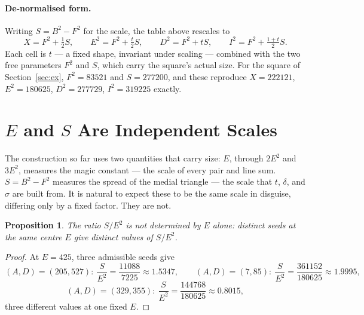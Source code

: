 \documentclass[12pt]{article}
\newtheorem{proposition}[theorem]{Proposition}
\theoremstyle{remark}
\begin{document}
\paragraph{De-normalised form.}
Writing $S = B^2 - F^2$ for the scale, the table above rescales to
\[
X = F^2 + \tfrac12 S, \qquad
E^2 = F^2 + \tfrac{t}{2} S, \qquad
D^2 = F^2 + tS, \qquad
I^2 = F^2 + \tfrac{1+t}{2} S .
\]
Each cell is $t$ --- a fixed shape, invariant under scaling --- combined
with the two free parameters $F^2$ and $S$, which carry the square's
actual size. For the square of Section~\ref{sec:ex}, $F^2 = 83521$ and
$S = 277200$, and these reproduce $X = 222121$, $E^2 = 180625$,
$D^2 = 277729$, $I^2 = 319225$ exactly.

\section{$E$ and $S$ Are Independent Scales}\label{sec:independentscales}

The construction so far uses two quantities that carry size: $E$,
through $2E^2$ and $3E^2$, measures the magic constant --- the scale
of every pair and line sum. $S = B^2 - F^2$ measures the spread of
the medial triangle --- the scale that $t$, $\delta$, and $\sigma$ are
built from. It is natural to expect these to be the same scale in
disguise, differing only by a fixed factor. They are not.

\begin{proposition}\label{prop:independentscales}
The ratio $S/E^2$ is not determined by $E$ alone: distinct seeds at
the same centre $E$ give distinct values of $S/E^2$.
\end{proposition}

\begin{proof}
At $E = 425$, three admissible seeds give
\[
(A,D) = (205,527): \ \frac{S}{E^2} = \frac{11088}{7225} \approx 1.5347,
\qquad
(A,D) = (7,85): \ \frac{S}{E^2} = \frac{361152}{180625} \approx 1.9995,
\]
\[
(A,D) = (329,355): \ \frac{S}{E^2} = \frac{144768}{180625} \approx 0.8015,
\]
three different values at one fixed $E$.
\end{proof}
\end{document}

